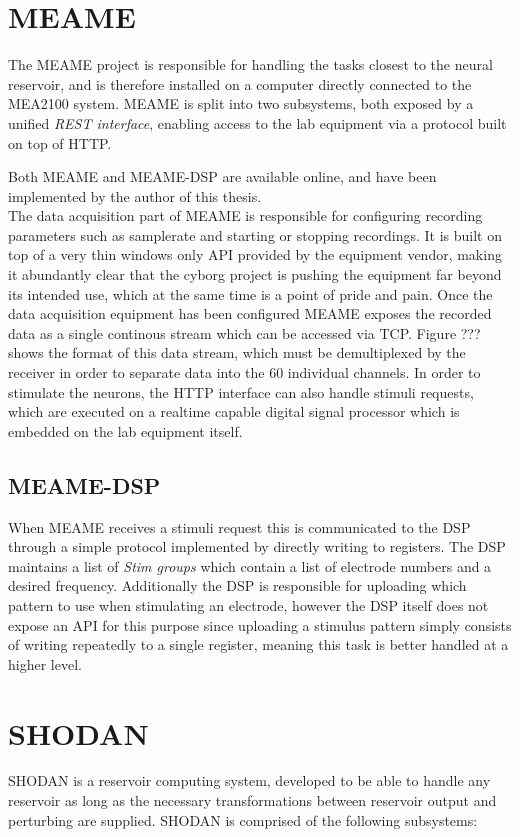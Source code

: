 \section{MEAME}
The MEAME project is responsible for handling the tasks closest to the neural
reservoir, and is therefore installed on a computer directly connected to the
MEA2100 system.
MEAME is split into two subsystems, both exposed by a unified \emph{REST
  interface}, enabling access to the lab equipment via a protocol built on top
of HTTP.

Both MEAME and MEAME-DSP are available online, and have been implemented by the
author of this thesis.\\

The data acquisition part of MEAME is responsible for configuring recording
parameters such as samplerate and starting or stopping recordings.
It is built on top of a very thin windows only API provided by the equipment vendor, making
it abundantly clear that the cyborg project is pushing the equipment far beyond
its intended use, which at the same time is a point of pride and pain.
Once the data acquisition equipment has been configured MEAME exposes the
recorded data as a single continous stream which can be accessed via TCP.
Figure ??? shows the format of this data stream, which must be demultiplexed by
the receiver in order to separate data into the 60 individual channels.
In order to stimulate the neurons, the HTTP interface can also handle stimuli
requests, which are executed on a realtime capable digital signal processor
which is embedded on the lab equipment itself.
\subsection{MEAME-DSP}
When MEAME receives a stimuli request this is communicated to the DSP through a
simple protocol implemented by directly writing to registers.
The DSP maintains a list of \emph{Stim groups} which contain a list of electrode
numbers and a desired frequency.
Additionally the DSP is responsible for uploading which pattern to use when
stimulating an electrode, however the DSP itself does not expose an API for this
purpose since uploading a stimulus pattern simply consists of writing repeatedly
to a single register, meaning this task is better handled at a higher level.

\section{SHODAN}
SHODAN is a reservoir computing system, developed to be able to handle any
reservoir as long as the necessary transformations between reservoir output and
perturbing are supplied.
SHODAN is comprised of the following subsystems:

\cleardoublepage

